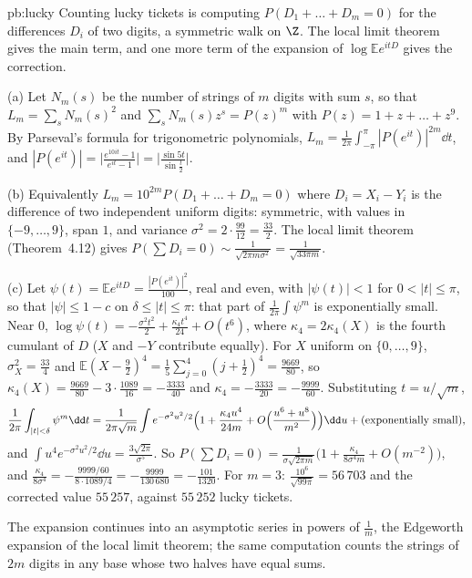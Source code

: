 \begin{solution}{pb:lucky}
\idea Counting lucky tickets is computing $P(D_1+\dots+D_m=0)$ for the differences $D_i$ of two digits, a symmetric walk on $\Z$. The local limit theorem gives the main
term, and one more term of the expansion of $\log\mathbb Ee^{itD}$ gives the correction.

\writeup (a) Let $N_m(s)$ be the number of strings of $m$ digits with sum $s$, so that $L_m=\sum_sN_m(s)^2$ and $\sum_sN_m(s)z^s=P(z)^m$ with $P(z)=1+z+\dots+z^9$. By
Parseval's formula for trigonometric polynomials, $L_m=\frac1{2\pi}\int_{-\pi}^\pi|P(e^{it})|^{2m}\dd t$, and $|P(e^{it})|=\bigl|\frac{e^{10it}-1}{e^{it}-1}\bigr|=\bigl|\frac{\sin5t}{\sin\frac t2}\bigr|$.

(b) Equivalently $L_m=10^{2m}P(D_1+\dots+D_m=0)$ where $D_i=X_i-Y_i$ is the difference of two independent uniform digits: symmetric, with values in $\{-9,\dots,9\}$,
span $1$, and variance $\sigma^2=2\cdot\frac{99}{12}=\frac{33}2$. The local limit theorem (Theorem~4.12) gives
$P(\sum D_i=0)\sim\frac1{\sqrt{2\pi m\sigma^2}}=\frac1{\sqrt{33\pi m}}$.

(c) Let $\psi(t)=\mathbb Ee^{itD}=\frac{|P(e^{it})|^2}{100}$, real and even, with $|\psi(t)|<1$ for $0<|t|\le\pi$, so that $|\psi|\le1-c$ on $\delta\le|t|\le\pi$: that part of
$\frac1{2\pi}\int\psi^m$ is exponentially small. Near $0$, $\log\psi(t)=-\frac{\sigma^2t^2}2+\frac{\kappa_4t^4}{24}+O(t^6)$, where $\kappa_4=2\kappa_4(X)$ is the fourth cumulant
of $D$ ($X$ and $-Y$ contribute equally). For $X$ uniform on $\{0,\dots,9\}$, $\sigma_X^2=\frac{33}4$ and $\mathbb E(X-\frac92)^4=\frac15\sum_{j=0}^4(j+\frac12)^4=\frac{9669}{80}$, so
$\kappa_4(X)=\frac{9669}{80}-3\cdot\frac{1089}{16}=-\frac{3333}{40}$ and $\kappa_4=-\frac{3333}{20}=-\frac{9999}{60}$. Substituting
$t=u/\sqrt m$,
\[
\frac1{2\pi}\int_{|t|<\delta}\psi^m\dd t=\frac1{2\pi\sqrt m}\int e^{-\sigma^2u^2/2}\Bigl(1+\frac{\kappa_4u^4}{24m}+O\Bigl(\frac{u^6+u^8}{m^2}\Bigr)\Bigr)\dd u+(\text{exponentially small}),
\]
and $\int u^4e^{-\sigma^2u^2/2}\dd u=\frac{3\sqrt{2\pi}}{\sigma^5}$. So $P(\sum D_i=0)=\frac1{\sigma\sqrt{2\pi m}}\bigl(1+\frac{\kappa_4}{8\sigma^4m}+O(m^{-2})\bigr)$, and
$\frac{\kappa_4}{8\sigma^4}=-\frac{9999/60}{8\cdot1089/4}=-\frac{9999}{130\,680}=-\frac{101}{1320}$. For $m=3$: $\frac{10^6}{\sqrt{99\pi}}=56\,703$ and the corrected value $55\,257$,
against $55\,252$ lucky tickets.

\leads The expansion continues into an asymptotic series in powers of $\frac1m$, the Edgeworth expansion of the local limit theorem; the same
computation counts the strings of $2m$ digits in any base whose two halves have equal sums.
\end{solution}

